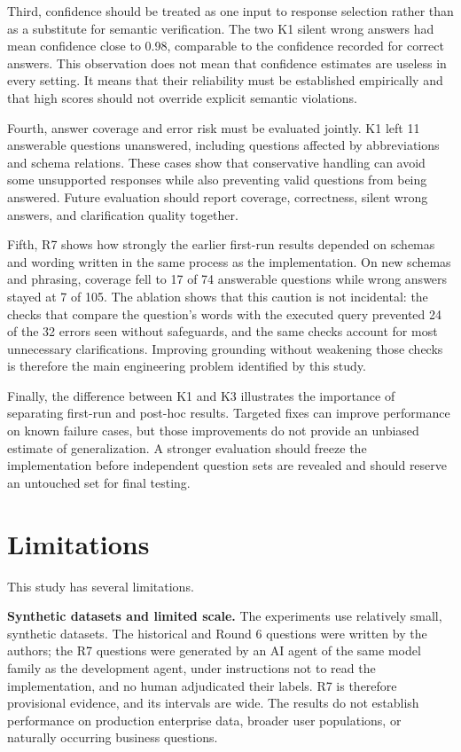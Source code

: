 \documentclass[conference]{IEEEtran}
\begin{document}
Third, confidence should be treated as one input to response selection rather than as a substitute for semantic verification. The two K1 silent wrong answers had mean confidence close to 0.98, comparable to the confidence recorded for correct answers. This observation does not mean that confidence estimates are useless in every setting. It means that their reliability must be established empirically and that high scores should not override explicit semantic violations.

Fourth, answer coverage and error risk must be evaluated jointly. K1 left 11 answerable questions unanswered, including questions affected by abbreviations and schema relations. These cases show that conservative handling can avoid some unsupported responses while also preventing valid questions from being answered. Future evaluation should report coverage, correctness, silent wrong answers, and clarification quality together.

Fifth, R7 shows how strongly the earlier first-run results depended on schemas and wording written in the same process as the implementation. On new schemas and phrasing, coverage fell to 17 of 74 answerable questions while wrong answers stayed at 7 of 105. The ablation shows that this caution is not incidental: the checks that compare the question's words with the executed query prevented 24 of the 32 errors seen without safeguards, and the same checks account for most unnecessary clarifications. Improving grounding without weakening those checks is therefore the main engineering problem identified by this study.

Finally, the difference between K1 and K3 illustrates the importance of separating first-run and post-hoc results. Targeted fixes can improve performance on known failure cases, but those improvements do not provide an unbiased estimate of generalization. A stronger evaluation should freeze the implementation before independent question sets are revealed and should reserve an untouched set for final testing.

\section{Limitations}

This study has several limitations.

\textbf{Synthetic datasets and limited scale.} The experiments use relatively small, synthetic datasets. The historical and Round 6 questions were written by the authors; the R7 questions were generated by an AI agent of the same model family as the development agent, under instructions not to read the implementation, and no human adjudicated their labels. R7 is therefore provisional evidence, and its intervals are wide. The results do not establish performance on production enterprise data, broader user populations, or naturally occurring business questions.
\end{document}
